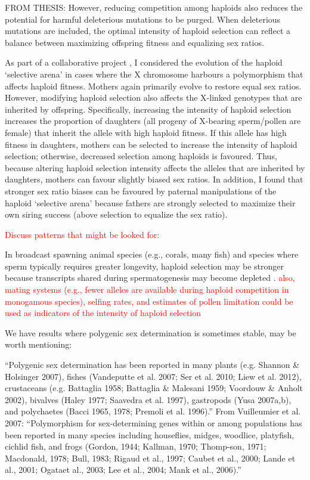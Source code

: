 \documentclass[12pt]{article}
\begin{document}
{\color{blue}
FROM THESIS:
However, reducing competition among haploids also reduces the potential for harmful deleterious mutations to be purged. 
When deleterious mutations are included, the optimal intensity of haploid selection can reflect a balance between maximizing offspring fitness and equalizing sex ratios. 

As part of a collaborative project \citep{Otto:2015va}, I considered the evolution of the haploid `selective arena' in cases where the X chromosome harbours a polymorphism that affects haploid fitness. 
Mothers again primarily evolve to restore equal sex ratios.
However, modifying haploid selection also affects the X-linked genotypes that are inherited by offspring. 
Specifically, increasing the intensity of haploid selection increases the proportion of daughters (all progeny of X-bearing sperm/pollen are female) that inherit the allele with high haploid fitness. 
If this allele has high fitness in daughters, mothers can be selected to increase the intensity of haploid selection; otherwise, decreased selection among haploids is favoured.
Thus, because altering haploid selection intensity affects the alleles that are inherited by daughters, mothers can favour slightly biased sex ratios. 
In addition, I found that stronger sex ratio biases can be favoured by paternal manipulations of the haploid `selective arena' because fathers are strongly selected to maximize their own siring success (above selection to equalize the sex ratio).

}

\textcolor{red}{\noindent Discuss patterns that might be looked for:}

In broadcast spawning animal species (e.g., corals, many fish) and species where sperm typically requires greater longevity, haploid selection may be stronger because transcripts shared during spermatogenesis may become depleted \citep{Immler:2014im}. 
\textcolor{red}{also, mating systems (e.g., fewer alleles are available during haploid competition in monogamous species), selfing rates, and estimates of pollen limitation could be used as indicators of the intensity of haploid selection}

\noindent
We have results where polygenic sex determination is sometimes stable, may be worth mentioning:

``Polygenic sex determination has been reported in many plants (e.g. Shannon \& Holsinger 2007), fishes (Vandeputte et al. 2007; Ser et al. 2010; Liew et al. 2012), crustaceans (e.g. Battaglia 1958; Battaglia \& Malesani 1959; Voordouw
\& Anholt 2002), bivalves (Haley 1977; Saavedra et al. 1997), gastropods (Yusa 2007a,b), and polychaetes (Bacci 1965, 1978; Premoli et al. 1996).''
From Vuilleumier et al. 2007:
``Polymorphism for sex-determining genes within or among populations has been reported in many species including houseflies, midges, woodlice, platyfish, cichlid fish, and frogs (Gordon, 1944; Kallman, 1970; Thomp-son, 1971; Macdonald, 1978; Bull, 1983; Rigaud et al., 1997; Caubet et al., 2000; Lande et al., 2001; Ogataet al., 2003; Lee et al., 2004; Mank et al., 2006).''
\end{document}
